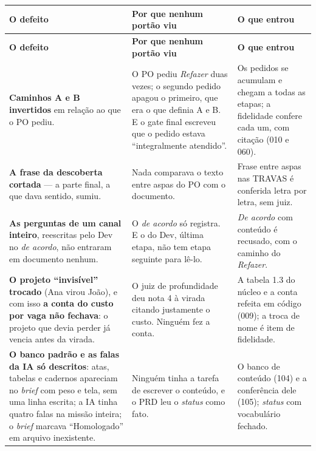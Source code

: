 \documentclass[11pt,a4paper]{article}
\begin{document}
\begin{center}
\begin{longtable}{p{5.0cm}p{4.7cm}p{5.0cm}}
\toprule
\sffamily\bfseries\footnotesize\color{unNavy}O defeito & \sffamily\bfseries\footnotesize\color{unNavy}Por que nenhum portão viu & \sffamily\bfseries\footnotesize\color{unNavy}O que entrou \\
\midrule
\endfirsthead
\toprule
\sffamily\bfseries\footnotesize\color{unNavy}O defeito & \sffamily\bfseries\footnotesize\color{unNavy}Por que nenhum portão viu & \sffamily\bfseries\footnotesize\color{unNavy}O que entrou \\
\midrule
\endhead
\footnotesize \textbf{Caminhos A e B invertidos} em relação ao que o PO pediu. & \footnotesize O PO pediu \emph{Refazer} duas vezes; o segundo pedido apagou o primeiro, que era o que definia A e B. E o gate final escreveu que o pedido estava ``integralmente atendido''. & \footnotesize Os pedidos se acumulam e chegam a todas as etapas; a fidelidade confere cada um, com citação (010 e 060). \\
\addlinespace
\footnotesize \textbf{A frase da descoberta cortada} --- a parte final, a que dava sentido, sumiu. & \footnotesize Nada comparava o texto entre aspas do PO com o documento. & \footnotesize Frase entre aspas nas TRAVAS é conferida letra por letra, sem juiz. \\
\addlinespace
\footnotesize \textbf{As perguntas de um canal inteiro}, reescritas pelo Dev no \emph{de acordo}, não entraram em documento nenhum. & \footnotesize O \emph{de acordo} só registra. E o do Dev, última etapa, não tem etapa seguinte para lê-lo. & \footnotesize \emph{De acordo} com conteúdo é recusado, com o caminho do \emph{Refazer}. \\
\addlinespace
\footnotesize \textbf{O projeto ``invisível'' trocado} (Ana virou João), e com isso \textbf{a conta do custo por vaga não fechava}: o projeto que devia perder já vencia antes da virada. & \footnotesize O juiz de profundidade deu nota 4 à virada citando justamente o custo. Ninguém fez a conta. & \footnotesize A tabela 1.3 do núcleo e a conta refeita em código (009); a troca de nome é item de fidelidade. \\
\addlinespace
\footnotesize \textbf{O banco padrão e as falas da IA só descritos}: atas, tabelas e cadernos apareciam no \emph{brief} com peso e tela, sem uma linha escrita; a IA tinha quatro falas na missão inteira; o \emph{brief} marcava ``Homologado'' em arquivo inexistente. & \footnotesize Ninguém tinha a tarefa de escrever o conteúdo, e o PRD leu o \emph{status} como fato. & \footnotesize O banco de conteúdo (104) e a conferência dele (105); \emph{status} com vocabulário fechado. \\

\end{longtable}
\end{center}
\end{document}
